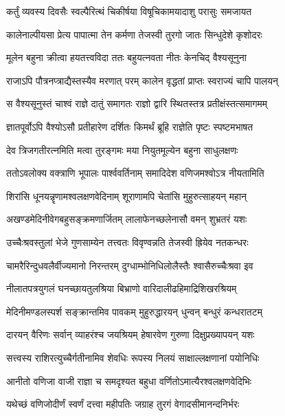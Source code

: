 \twolineshloka
{कर्तुं व्यवस्य दिवसैः स्वल्पैरित्थं चिकीर्षया}
{विषूचिकामयादाशु परासुः समजायत} %

\twolineshloka
{कालेनाल्पीयसा प्रेत्य पापात्मा तेन कर्मणा}
{तेजस्वी तुरगो जातः सिन्धुदेशे कृशोदरः} %

\twolineshloka
{मूलेन बहुना क्रीत्वा हयतत्त्वविदा ततः}
{बहुयत्नवता नीतः केनचिद् वैश्यसूनुना} %

\twolineshloka
{राजाऽपि पौत्रनप्त्राद्यैस्तस्यैव मरणात् परम्}
{कालेन वृद्धतां प्राप्तः स्वराज्यं चापि पालयन्} %

\twolineshloka
{स वैश्यसूनुस्तं चाश्वं राज्ञे दातुं समागतः}
{राज्ञो द्वारि स्थितस्तत्र प्रतीक्षंस्तत्समागमम्} %

\twolineshloka
{ज्ञातपूर्वोऽपि वैश्योऽसौ प्रतीहारेण दर्शितः}
{किमर्थं ब्रूहि राज्ञेति पृष्टः स्पष्टमभाषत} %

\twolineshloka
{देव त्रिजगतीरत्नमिति मत्वा तुरङ्गमः}
{मया नियुतमूल्येन बहुना साधुलक्षणः} %

\twolineshloka
{ततोऽवलोक्य वक्त्राणि भूपालः पार्श्ववर्तिनाम्}
{समादिदेश वणिजमश्वोऽत्र नीयतामिति} %

\twolineshloka
{शिरांसि धूनयन्नॄणामश्वलक्षणवेदिनाम्}
{शूराणामपि चेतांसि मुहुरुत्साहयन् महान्} %

\twolineshloka
{अखण्डमेदिनीवेगबहुसङ्क्रमणार्जितम्}
{लालाफेनच्छलेनासौ वमन् शुभ्रतरं यशः} %

\twolineshloka
{उच्चैःश्रवस्तुलां भेजे गुणसाम्येन तत्त्वतः}
{विवृण्वन्नति तेजस्वी ह्रियेव नतकन्धरः} %

\twolineshloka
{चामरैरिन्दुधवलैर्वीज्यमानो निरन्तरम्}
{दुग्धाम्भोनिधिलोलैस्तैः श्वासैरुच्चैःश्रवा इव} %

\twolineshloka
{नीलातपत्रयुगलं घनच्छायतुलश्रिया}
{बिभ्राणो वारिदालीढहिमाद्रिशिखरश्रियम्} %

\twolineshloka
{मेदिनीमण्डलस्पर्श सङ्क्रान्तमिव पावकम्}
{मुहुरुद्धारयन् धुन्वन् बन्धुरं कन्धरातटम्} %

\twolineshloka
{दारयन् वैरिणः सर्वान् व्याहरंश्च जयश्रियम्}
{हेषारवेण गुरुणा दिक्षुप्रख्यापयन् यशः} %

\twolineshloka
{सत्त्वस्य राशिरत्युच्चैर्गतीनामिव शेवधिः}
{रूपस्य निलयं साक्षाल्लक्षणानां पयोनिधिः} %

\twolineshloka
{आनीतो वणिजा वाजी राज्ञा च समदृश्यत}
{बहुधा वर्णितोऽमात्यैरश्वलक्षणवेदिभिः} %

\twolineshloka
{यथेच्छं वणिजोदीर्णं स्वर्णं दत्त्वा महीपतिः}
{जग्राह तुरगं वेगादसीमानन्दनिर्भरः} %

